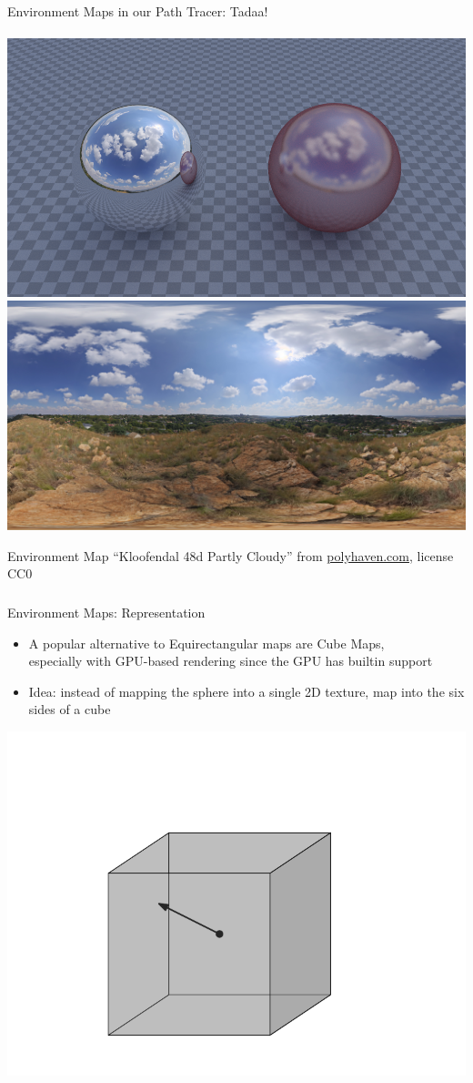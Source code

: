 \documentclass[utf8,stillsansserifmath,fleqn,t]{beamer}
\begin{document}
\begin{frame}[label=envmap-example]
\frametitle{\insertsection}
Environment Maps in our Path Tracer: Tadaa!\\~\\
\includegraphics[height=.34\textheight]{./fig/pathtracer-result-12-3.png}\hfill
\includegraphics[height=.34\textheight]{./fig/envmap-equirect-12-3.jpg}\\[-0.5ex]
\centerline{\tiny Environment Map ``Kloofendal 48d Partly Cloudy'' from
\href{https://polyhaven.com/a/kloofendal_48d_partly_cloudy}{polyhaven.com}, license CC0}
\end{frame}

\begin{frame}
\frametitle{\insertsection}
Environment Maps: Representation
\begin{itemize}
\item A popular alternative to Equirectangular maps are Cube Maps,\\
    especially with GPU-based rendering since the GPU has builtin support
\item Idea: instead of mapping the sphere into a single 2D texture,
map into the six sides of a cube
\end{itemize}
\centerline{\includegraphics[width=.35\textwidth]{./fig/envmap-principle-cube.pdf}}
\end{frame}
\end{document}
